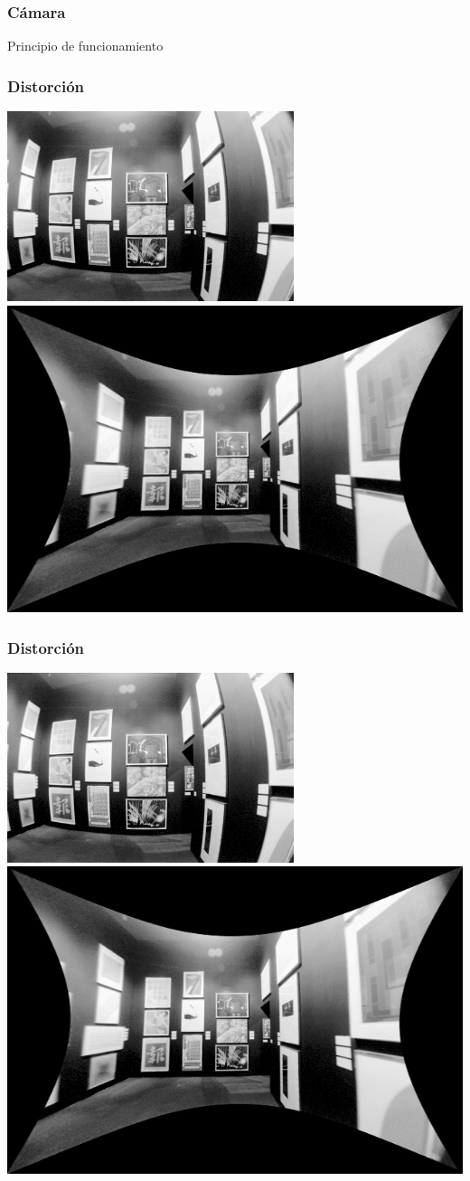 \begin{frame}
    \frametitle{Cámara}
    
    \footnotesize
    
    \begin{block}{Principio de funcionamiento}
    	
    \end{block}

\end{frame}

\begin{frame}
	\frametitle{Distorción}
	
	\includegraphics[width=0.4\columnwidth]{images/camera/distorted_image.png}
	\includegraphics[width=0.4\columnwidth]{images/camera/undistorted_image.png}
	
\end{frame}


\begin{frame}
	\frametitle{Distorción}
	
	\includegraphics[width=0.4\columnwidth]{images/camera/distorted_image.png}
	\includegraphics[width=0.4\columnwidth]{images/camera/undistorted_image.png}
	
\end{frame}



